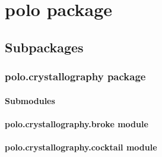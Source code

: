 \documentclass[letterpaper,10pt,english]{sphinxmanual}
\begin{document}
\chapter{polo package}
\label{\detokenize{polo:polo-package}}\label{\detokenize{polo::doc}}

\section{Subpackages}
\label{\detokenize{polo:subpackages}}

\subsection{polo.crystallography package}
\label{\detokenize{polo.crystallography:polo-crystallography-package}}\label{\detokenize{polo.crystallography::doc}}

\subsubsection{Submodules}
\label{\detokenize{polo.crystallography:submodules}}

\subsubsection{polo.crystallography.broke module}
\label{\detokenize{polo.crystallography:polo-crystallography-broke-module}}

\subsubsection{polo.crystallography.cocktail module}
\label{\detokenize{polo.crystallography:module-polo.crystallography.cocktail}}\label{\detokenize{polo.crystallography:polo-crystallography-cocktail-module}}
\end{document}
